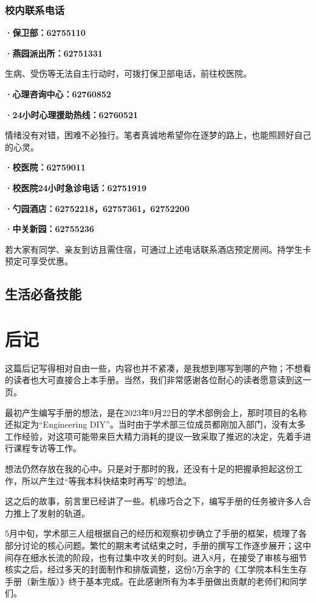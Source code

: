 \documentclass[11pt,oneside]{book}
\begin{document}
\subsection{校内联系电话}

\textbf{·保卫部：62755110}

\textbf{·燕园派出所：62751331}

生病、受伤等无法自主行动时，可拨打保卫部电话，前往校医院。

\vspace{10pt}

\textbf{·心理咨询中心：62760852}

\textbf{·24小时心理援助热线：62760521}

情绪没有对错，困难不必独行。笔者真诚地希望你在逐梦的路上，也能照顾好自己的心灵。

\vspace{10pt}

\textbf{·校医院：62759011}

\textbf{·校医院24小时急诊电话：62751919}

\textbf{·勺园酒店：62752218，62757361，62752200}

\textbf{·中关新园：62755236}

若大家有同学、亲友到访且需住宿，可通过上述电话联系酒店预定房间。持学生卡预定可享受优惠。

\section{生活必备技能}

\backmatter

\chapter*{后记}
这篇后记写得相对自由一些，内容也并不紧凑，是我想到哪写到哪的产物；不想看的读者也大可直接合上本手册。当然，我们非常感谢各位耐心的读者愿意读到这一页。

最初产生编写手册的想法，是在2023年9月22日的学术部例会上，那时项目的名称还拟定为“Engineering DIY”。当时由于学术部三位成员都刚加入部门，没有太多工作经验，对这项可能带来巨大精力消耗的提议一致采取了推迟的决定，先着手进行课程专访等工作。

想法仍然存放在我的心中。只是对于那时的我，还没有十足的把握承担起这份工作，所以产生过“等我本科快结束时再写”的想法。

这之后的故事，前言里已经讲了一些。机缘巧合之下，编写手册的任务被许多人合力推上了发射的轨道。

5月中旬，学术部三人组根据自己的经历和观察初步确立了手册的框架，梳理了各部分讨论的核心问题。繁忙的期末考试结束之时，手册的撰写工作逐步展开；这中间存在细水长流的阶段，也有过集中攻关的时刻。进入8月，在接受了审核与细节核实之后，经过多天的封面制作和排版调整，这份5万余字的《工学院本科生生存手册（新生版）》终于基本完成。在此感谢所有为本手册做出贡献的老师们和同学们。
\end{document}
